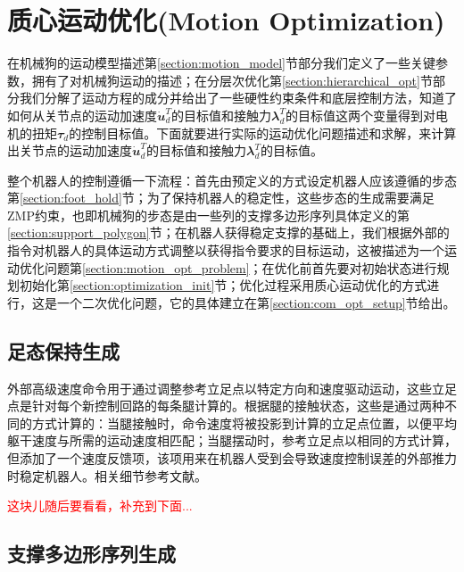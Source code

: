 \section[质心运动优化(Motion Optimization)]{质心运动优化(Motion Optimization)\cite[p3]{Bellicoso_Jenelten_Fankhauser_Gehring_Hwangbo_Hutter_2017}}
在机械狗的运动模型描述第\ref{section:motion_model}节部分我们定义了一些关键参数，拥有了对机械狗运动的描述；在分层次优化第\ref{section:hierarchical_opt}节部分我们分解了运动方程的成分并给出了一些硬性约束条件和底层控制方法，知道了如何从关节点的运动加速度$\mathbfit{\dot u}_d^T$的目标值和接触力$\mathbfit{\lambda}_d^T$的目标值这两个变量得到对电机的扭矩$\mathbfit{\tau}_d$的控制目标值。下面就要进行实际的运动优化问题描述和求解，来计算出关节点的运动加速度$\mathbfit{\dot u}_d^T$的目标值和接触力$\mathbfit{\lambda}_d^T$的目标值。

整个机器人的控制遵循一下流程：首先由预定义的方式设定机器人应该遵循的步态第\ref{section:foot_hold}节；为了保持机器人的稳定性，这些步态的生成需要满足ZMP约束，也即机械狗的步态是由一些列的支撑多边形序列具体定义的第\ref{section:support_polygon}节；在机器人获得稳定支撑的基础上，我们根据外部的指令对机器人的具体运动方式调整以获得指令要求的目标运动，这被描述为一个运动优化问题第\ref{section:motion_opt_problem}；在优化前首先要对初始状态进行规划初始化第\ref{section:optimization_init}节；优化过程采用质心运动优化的方式进行，这是一个二次优化问题，它的具体建立在第\ref{section:com_opt_setup}节给出。

\subsection[足态保持生成]{\label{section:foot_hold}足态保持生成}
外部高级速度命令用于通过调整参考立足点以特定方向和速度驱动运动，这些立足点是针对每个新控制回路的每条腿计算的。根据腿的接触状态，这些是通过两种不同的方式计算的：当腿接触时，命令速度将被投影到计算的立足点位置，以便平均躯干速度与所需的运动速度相匹配；当腿摆动时，参考立足点以相同的方式计算，但添加了一个速度反馈项，该项用来在机器人受到会导致速度控制误差的外部推力时稳定机器人。相关细节参考文献\cite{Gehring_Coros_Hutter_Bellicoso_Heijnen_Diethelm_Bloesch_Fankhauser_Hwangbo_Hoepflinger_et_al_2016}。

\textcolor{red}{这块儿随后要看看，补充到下面...}

\subsection[支撑多边形序列生成]{\label{section:support_polygon}支撑多边形序列生成}

